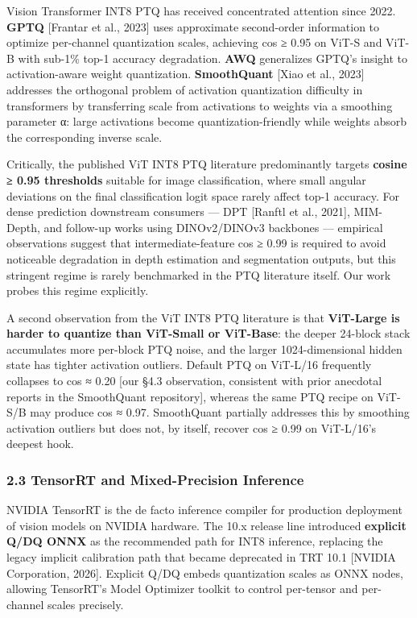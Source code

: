 \documentclass[
]{article}
\begin{document}
Vision Transformer INT8 PTQ has received concentrated attention since
2022. \textbf{GPTQ} {[}Frantar et al., 2023{]} uses approximate
second-order information to optimize per-channel quantization scales,
achieving cos ≥ 0.95 on ViT-S and ViT-B with sub-1\% top-1 accuracy
degradation. \textbf{AWQ} generalizes GPTQ's insight to activation-aware
weight quantization. \textbf{SmoothQuant} {[}Xiao et al., 2023{]}
addresses the orthogonal problem of activation quantization difficulty
in transformers by transferring scale from activations to weights via a
smoothing parameter α: large activations become quantization-friendly
while weights absorb the corresponding inverse scale.

Critically, the published ViT INT8 PTQ literature predominantly targets
\textbf{cosine ≥ 0.95 thresholds} suitable for image classification,
where small angular deviations on the final classification logit space
rarely affect top-1 accuracy. For dense prediction downstream consumers
--- DPT {[}Ranftl et al., 2021{]}, MIM-Depth, and follow-up works using
DINOv2/DINOv3 backbones --- empirical observations suggest that
intermediate-feature cos ≥ 0.99 is required to avoid noticeable
degradation in depth estimation and segmentation outputs, but this
stringent regime is rarely benchmarked in the PTQ literature itself. Our
work probes this regime explicitly.

A second observation from the ViT INT8 PTQ literature is that
\textbf{ViT-Large is harder to quantize than ViT-Small or ViT-Base}: the
deeper 24-block stack accumulates more per-block PTQ noise, and the
larger 1024-dimensional hidden state has tighter activation outliers.
Default PTQ on ViT-L/16 frequently collapses to cos ≈ 0.20 {[}our §4.3
observation, consistent with prior anecdotal reports in the SmoothQuant
repository{]}, whereas the same PTQ recipe on ViT-S/B may produce cos ≈
0.97. SmoothQuant partially addresses this by smoothing activation
outliers but does not, by itself, recover cos ≥ 0.99 on ViT-L/16's
deepest hook.

\subsubsection{2.3 TensorRT and Mixed-Precision
Inference}\label{tensorrt-and-mixed-precision-inference}

NVIDIA TensorRT is the de facto inference compiler for production
deployment of vision models on NVIDIA hardware. The 10.x release line
introduced \textbf{explicit Q/DQ ONNX} as the recommended path for INT8
inference, replacing the legacy implicit calibration path that became
deprecated in TRT 10.1 {[}NVIDIA Corporation, 2026{]}. Explicit Q/DQ
embeds quantization scales as ONNX nodes, allowing TensorRT's Model
Optimizer toolkit to control per-tensor and per-channel scales
precisely.
\end{document}
